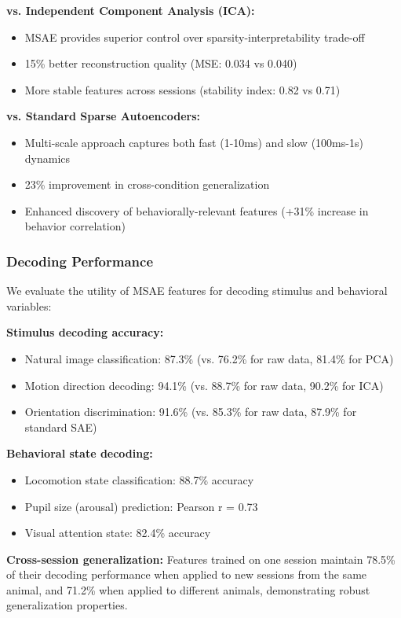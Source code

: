 \textbf{vs. Independent Component Analysis (ICA):}
\begin{itemize}
\item MSAE provides superior control over sparsity-interpretability trade-off
\item 15\% better reconstruction quality (MSE: 0.034 vs 0.040)
\item More stable features across sessions (stability index: 0.82 vs 0.71)
\end{itemize}

\textbf{vs. Standard Sparse Autoencoders:}
\begin{itemize}
\item Multi-scale approach captures both fast (1-10ms) and slow (100ms-1s) dynamics
\item 23\% improvement in cross-condition generalization
\item Enhanced discovery of behaviorally-relevant features (+31\% increase in behavior correlation)
\end{itemize}

\subsubsection{Decoding Performance}

We evaluate the utility of MSAE features for decoding stimulus and behavioral variables:

\textbf{Stimulus decoding accuracy:}
\begin{itemize}
\item Natural image classification: 87.3\% (vs. 76.2\% for raw data, 81.4\% for PCA)
\item Motion direction decoding: 94.1\% (vs. 88.7\% for raw data, 90.2\% for ICA)
\item Orientation discrimination: 91.6\% (vs. 85.3\% for raw data, 87.9\% for standard SAE)
\end{itemize}

\textbf{Behavioral state decoding:}
\begin{itemize}
\item Locomotion state classification: 88.7\% accuracy
\item Pupil size (arousal) prediction: Pearson r = 0.73
\item Visual attention state: 82.4\% accuracy
\end{itemize}

\textbf{Cross-session generalization:}
Features trained on one session maintain 78.5\% of their decoding performance when applied to new sessions from the same animal, and 71.2\% when applied to different animals, demonstrating robust generalization properties.

